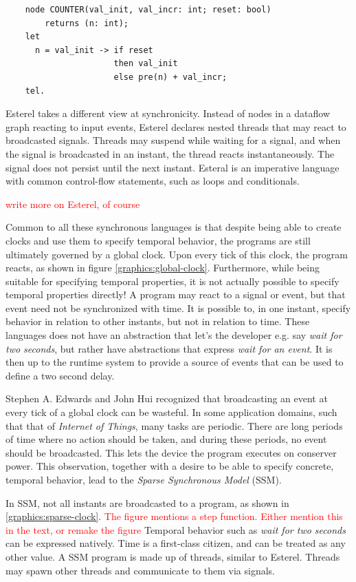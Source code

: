 \begin{verbatim}
    node COUNTER(val_init, val_incr: int; reset: bool)
        returns (n: int);
    let
      n = val_init -> if reset
                      then val_init
                      else pre(n) + val_incr;
    tel.
\end{verbatim}

Esterel takes a different view at synchronicity. Instead of nodes in a dataflow graph reacting to input events, Esterel
declares nested threads that may react to broadcasted signals. Threads may suspend while waiting for a signal, and when
the signal is broadcasted in an instant, the thread reacts instantaneously. The signal does not persist until the next
instant. Esteral is an imperative language with common control-flow statements, such as loops and conditionals.

\textcolor{red}{write more on Esterel, of course}

Common to all these synchronous languages is that despite being able to create clocks and use them to specify
temporal behavior, the programs are still ultimately governed by a global clock. Upon every tick of this clock, the program
reacts, as shown in figure \ref{graphics:global-clock}. Furthermore, while being suitable for specifying temporal
properties, it is not actually possible to specify temporal properties directly! A program may react to a signal or event,
but that event need not be synchronized with time. It is possible to, in one instant, specify behavior in relation to other
instants, but not in relation to time. These languages does not have an abstraction that let's the developer e.g. say
\textit{wait for two seconds}, but rather have abstractions that express \textit{wait for an event}. It is then up to the
runtime system to provide a source of events that can be used to define a two second delay.

Stephen A. Edwards and John Hui \cite{DBLP:conf/fdl/EdwardsH20} recognized that broadcasting an event at every tick of a global clock can be
wasteful. In some application domains, such that that of \textit{Internet of Things}, many tasks are periodic. There are
long periods of time where no action should be taken, and during these periods, no event should be broadcasted. This lets
the device the program executes on conserver power. This observation, together with a desire to be able to specify concrete,
temporal behavior, lead to the \textit{Sparse Synchronous Model} (SSM).

In SSM, not all instants are broadcasted to a program, as shown in \ref{graphics:sparse-clock}. \textcolor{red}{The figure mentions a step function. Either mention this in the text, or remake the figure} Temporal behavior such as
\textit{wait for two seconds} can be expressed natively. Time is a first-class citizen, and can be treated as any other value.
A SSM program is made up of threads, similar to Esterel. Threads may spawn other threads and communicate to them via signals.

